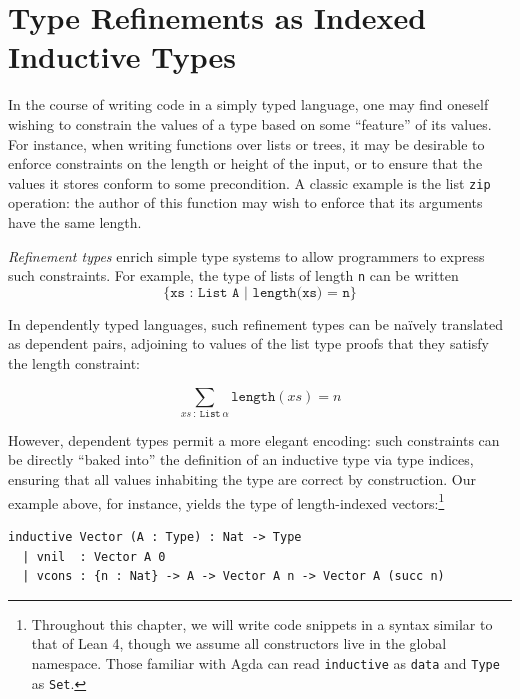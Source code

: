 

\newcommand{\llpr}[1]{\llparenthesis #1 \rrparenthesis}
\newcommand{\FamSet}{\mathsf{Fam}(\mathsf{Set})}

\chapter{Type Refinements as Indexed Inductive Types}

In the course of writing code in a simply typed language, one may find oneself wishing to constrain
the values of a type based on some ``feature'' of its values. For instance, when writing functions
over lists or trees, it may be desirable to enforce constraints on the length or height of the
input, or to ensure that the values it stores conform to some precondition. A classic example is
the list \texttt{zip} operation: the author of this function may wish to enforce that its arguments
have the same length.

\emph{Refinement types} enrich simple type systems to allow programmers to express such constraints.
For example, the type of lists of length \texttt{n} can be written
\[ \texttt{\{xs : List A | length(xs) = n\}} \]

In dependently typed languages, such refinement types can be na\"ively translated as dependent
pairs, adjoining to values of the list type proofs that they satisfy the length constraint:

\[ \sum_{xs ~:~ \texttt{List}~\alpha} \texttt{length}(xs) = n \]

However, dependent types permit a more elegant encoding: such constraints can be directly ``baked
into'' the definition of an inductive type via type indices, ensuring that all values inhabiting the
type are correct by construction. Our example above, for instance, yields the type of length-indexed
vectors:\footnote{Throughout this chapter, we will write code snippets in a syntax similar to that
of Lean 4, though we assume all constructors live in the global namespace. Those familiar with Agda
can read \texttt{inductive} as \texttt{data} and \texttt{Type} as \texttt{Set}.}

\begin{lstlisting}
inductive Vector (A : Type) : Nat -> Type
  | vnil  : Vector A 0
  | vcons : {n : Nat} -> A -> Vector A n -> Vector A (succ n)
\end{lstlisting}

